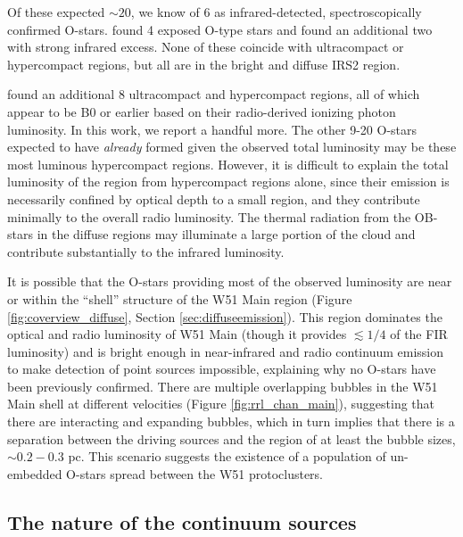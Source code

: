 Of these expected $\sim20$, we know of 6 as infrared-detected, spectroscopically
confirmed O-stars.  \citet{Figueredo2008a} found 4 exposed O-type stars and
\citet{Barbosa2008a} found an additional two with strong infrared excess.  None
of these coincide with ultracompact or hypercompact \hii regions, but all are
in the bright and diffuse IRS2 region.

\citet{Mehringer1994a} found an additional 8 ultracompact and hypercompact \hii
regions, all of which appear to be B0 or earlier based on their radio-derived
ionizing photon luminosity.  In this work, we report a handful more.  The other
9-20 O-stars expected to have \emph{already} formed given the observed total
luminosity may be these most luminous hypercompact \hii regions.  However, it
is difficult to explain the total luminosity of the region from hypercompact
\hii regions alone, since their emission is necessarily confined by optical
depth to a small region, and they contribute minimally to the overall radio
luminosity.  The thermal radiation from the OB-stars in the diffuse \hii
regions may illuminate a large portion of the cloud and contribute
substantially to the
infrared luminosity.

It is possible that the O-stars providing most of the observed
luminosity are near or within the ``shell'' structure of the W51 Main region
(Figure \ref{fig:coverview_diffuse}, Section \ref{sec:diffuseemission}).  This
region dominates the optical and radio luminosity of W51 Main (though it
provides $\lesssim 1/4$ of the FIR luminosity) and is bright enough in
near-infrared and radio continuum emission to make detection of point sources
impossible, explaining why no O-stars have been previously confirmed.  There
are multiple overlapping \hii bubbles in the W51 Main shell at different
velocities (Figure \ref{fig:rrl_chan_main}), suggesting that there are
interacting and  expanding bubbles, which in turn implies that there is a
separation between the driving sources and the \hii region of at least the
bubble sizes, $\sim0.2-0.3$ pc.  This scenario suggests the existence of a
population of un-embedded O-stars spread between the W51 protoclusters.

\subsection{The nature of the continuum sources}
\label{sec:contnature}

